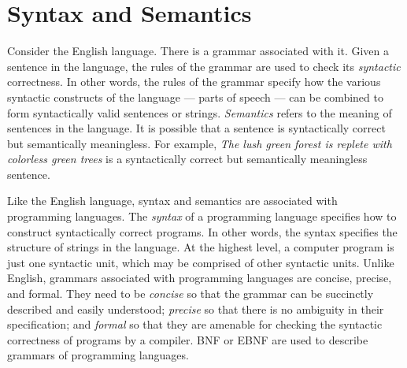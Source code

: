 









{\samepage\vspace{1ex}\noindent\usebox{\phicsep}\vspace{1.5ex}}
\vspace{-0.4in}
\section{Syntax and Semantics} \label{sec:SyntaxSemantics}

Consider the English language. There is a grammar associated with
it. Given a sentence in the language, the rules of the grammar are
used to check its \emph{syntactic} correctness. In other words,
the rules of the grammar specify how the various syntactic
constructs of the language --- parts of speech --- can be combined
to form syntactically valid sentences or strings. \emph{Semantics}
refers to the meaning of sentences in the language. It is possible
that a sentence is syntactically correct but semantically
meaningless. For example, \emph{The lush green forest is replete
with colorless green trees} is a syntactically correct but
semantically meaningless sentence.

Like the English language, syntax and semantics are associated
with programming languages. The \emph{syntax} of a programming
language specifies how to construct syntactically correct
programs. In other words, the syntax specifies the structure of
strings in the language. At the highest level, a computer program
is just one syntactic unit, which may be comprised of other
syntactic units. Unlike English, grammars associated with
programming languages are concise, precise, and formal. They need
to be \emph{concise} so that the grammar can be succinctly
described and easily understood; \emph{precise} so that there is
no ambiguity in their specification; and \emph{formal} so that
they are amenable for checking the syntactic correctness of
programs by a compiler. BNF or EBNF are used to describe grammars
of programming languages.


